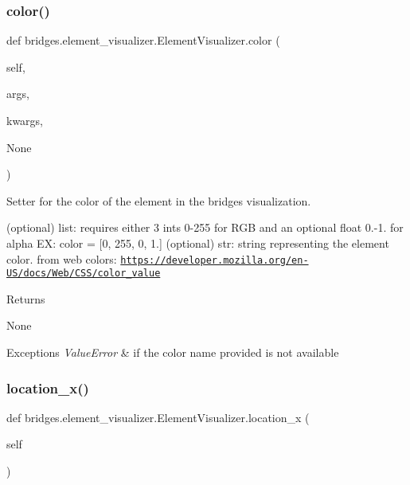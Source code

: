 \subsubsection{\texorpdfstring{color()}{color()}\hspace{0.1cm}{\footnotesize\ttfamily [2/2]}}
{\footnotesize\ttfamily def bridges.\+element\+\_\+visualizer.\+Element\+Visualizer.\+color (\begin{DoxyParamCaption}\item[{}]{self,  }\item[{}]{args,  }\item[{}]{kwargs,  }\item[{}]{None }\end{DoxyParamCaption})}



Setter for the color of the element in the bridges visualization. 

(optional) list\+: requires either 3 ints 0-\/255 for R\+GB and an optional float 0.-\/1. for alpha EX\+: color = \mbox{[}0, 255, 0, 1.\mbox{]} (optional) str\+: string representing the element color. from web colors\+: \href{https://developer.mozilla.org/en-US/docs/Web/CSS/color_value}{\tt https\+://developer.\+mozilla.\+org/en-\/\+U\+S/docs/\+Web/\+C\+S\+S/color\+\_\+value} \begin{DoxyReturn}{Returns}


None
\end{DoxyReturn}

\begin{DoxyExceptions}{Exceptions}
{\em Value\+Error} & if the color name provided is not available \\
\hline
\end{DoxyExceptions}
\mbox{\label{classbridges_1_1element__visualizer_1_1_element_visualizer_a10fc24a04e43afcb393f3444bd93f5d9}} 
\subsubsection{\texorpdfstring{location\+\_\+x()}{location\_x()}}
{\footnotesize\ttfamily def bridges.\+element\+\_\+visualizer.\+Element\+Visualizer.\+location\+\_\+x (\begin{DoxyParamCaption}\item[{}]{self }\end{DoxyParamCaption})}



